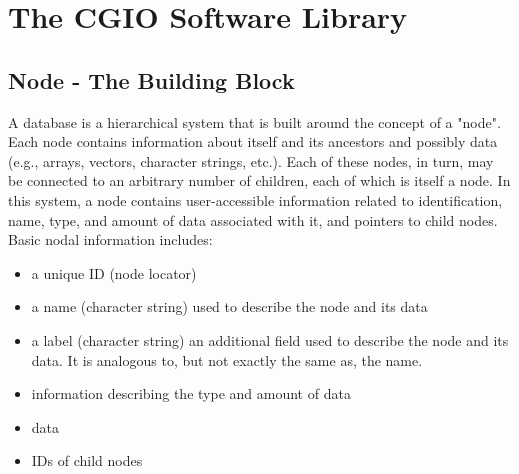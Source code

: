 \section{The CGIO Software Library}
\label{s:library}
\thispagestyle{plain}

\subsection{Node - The Building Block}
\label{s:node}

A database is a hierarchical system that is built around
the concept of a "node".
Each node contains information about itself and its ancestors and
possibly data (e.g., arrays, vectors, character strings, etc.).
Each of these nodes, in turn, may be connected to an arbitrary number of
children, each of which is itself a node.
In this system, a node contains user-accessible information related
to identification, name, type, and amount of data associated with it,
and pointers to child nodes.
Basic nodal information includes:

\begin{itemize}
\item a unique ID (node locator)
\item a name (character string) used to describe the node and its data
\item a label (character string) an additional field used to describe the
      node and its data.
      It is analogous to, but not exactly the same as, the name.
\item information describing the type and amount of data
\item data
\item IDs of child nodes
\end{itemize}


